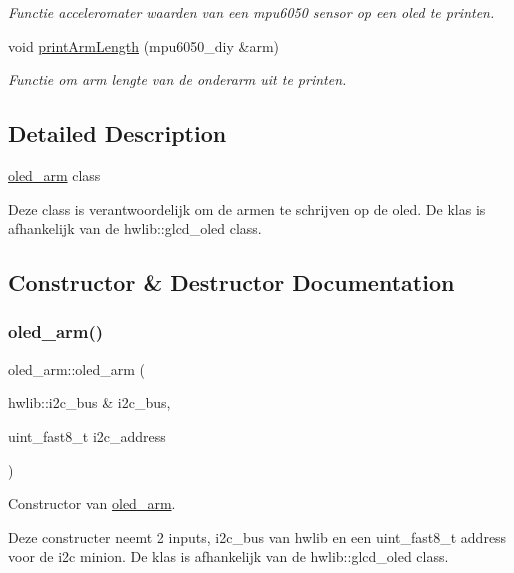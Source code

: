 \begin{DoxyCompactItemize}
\begin{DoxyCompactList}\small\item\em Functie acceleromater waarden van een mpu6050 sensor op een oled te printen. \end{DoxyCompactList}\item 
void \hyperlink{classoled__arm_a4bb3a852d58e7febdf07d7342199813a}{print\+Arm\+Length} (mpu6050\+\_\+diy \&arm)
\begin{DoxyCompactList}\small\item\em Functie om arm lengte van de onderarm uit te printen. \end{DoxyCompactList}\end{DoxyCompactItemize}


\subsection{Detailed Description}
\hyperlink{classoled__arm}{oled\+\_\+arm} class 

Deze class is verantwoordelijk om de armen te schrijven op de oled. De klas is afhankelijk van de hwlib\+::glcd\+\_\+oled class. 

\subsection{Constructor \& Destructor Documentation}
\mbox{\label{classoled__arm_a0d1436ad9431a1778767beef0510c908}} 
\subsubsection{\texorpdfstring{oled\+\_\+arm()}{oled\_arm()}}
{\footnotesize\ttfamily oled\+\_\+arm\+::oled\+\_\+arm (\begin{DoxyParamCaption}\item[{hwlib\+::i2c\+\_\+bus \&}]{i2c\+\_\+bus,  }\item[{uint\+\_\+fast8\+\_\+t}]{i2c\+\_\+address }\end{DoxyParamCaption})\hspace{0.3cm}{\ttfamily [inline]}}



Constructor van \hyperlink{classoled__arm}{oled\+\_\+arm}. 

Deze constructer neemt 2 inputs, i2c\+\_\+bus van hwlib en een uint\+\_\+fast8\+\_\+t address voor de i2c minion. De klas is afhankelijk van de hwlib\+::glcd\+\_\+oled class. 

